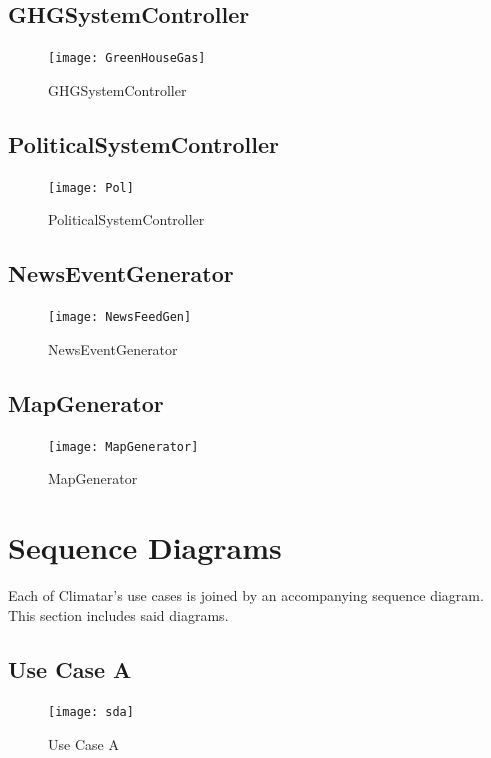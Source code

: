 \documentclass[]{article}
\begin{document}
\subsection{GHGSystemController}
\label{sub:overview}
\begin{figure}[H]
    \centering
    \texttt{[image: GreenHouseGas]}
    \caption{GHGSystemController}
    \label{fig:GreenHouseGas}
\end{figure}

\subsection{PoliticalSystemController}
\label{sub:overview}
\begin{figure}[H]
    \centering
    \texttt{[image: Pol]}
    \caption{PoliticalSystemController}
    \label{fig:Pol}
\end{figure}

\subsection{NewsEventGenerator}
\label{sub:overview}
\begin{figure}[H]
    \centering
    \texttt{[image: NewsFeedGen]}
    \caption{NewsEventGenerator}
    \label{fig:NewsFeedGen}
\end{figure}

\subsection{MapGenerator}
\label{sub:overview}
\begin{figure}[H]
    \centering
    \texttt{[image: MapGenerator]}
    \caption{MapGenerator}
    \label{fig:MapGenerator}
\end{figure}

\pagebreak

\section{Sequence Diagrams}
\label{sec:sequence_diagrams}

Each of Climatar's use cases is joined by an accompanying sequence diagram. This section includes said diagrams.

\vspace{5mm}

\subsection{Use Case A}
\label{sub:overview}
\begin{figure}[H]
    \centering
    \texttt{[image: sda]}
    \caption{Use Case A}
    \label{fig:sda}
\end{figure}
\end{document}
